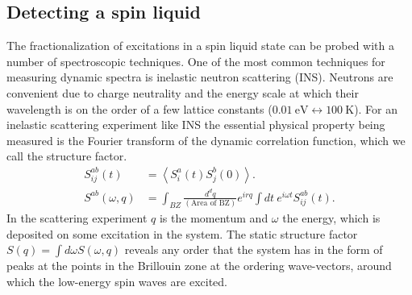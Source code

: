 \documentclass[aps,pra,preprint,groupedaddress]{revtex4-1}
\newcommand{\1}{\mathds{1}}
\begin{document}

\subsection{Detecting a spin liquid}
 
The fractionalization of excitations in a spin liquid state can be probed with a number of spectroscopic techniques. One of the most common techniques for measuring dynamic spectra is inelastic neutron scattering (INS). Neutrons are convenient due to charge neutrality and the energy scale at which their wavelength is on the order of a few lattice constants ($0.01~\textrm{eV} \leftrightarrow 100~\textrm{K}$). For an inelastic scattering experiment like INS the essential physical property being measured is the Fourier transform of the dynamic correlation function, which we call the structure factor. 
\begin{align}
S_{ij}^{ab}(t) &= \left< S_i^a(t) S_j^b(0) \right>.\\
S^{ab}(\omega,q)& = \int_{BZ} \frac{d^dq}{(\textrm{Area of BZ})} e^{i r q} \int {dt}~ e^{i\omega t} S_{ij}^{ab}(t).
\end{align}
In the scattering experiment $q$ is the momentum and $\omega$ the energy, which is deposited on some excitation in the system. The static structure factor $S(q) = \int d\omega S(\omega,q)$ reveals any order that the system has in the form of peaks at the points in the Brillouin zone at the ordering wave-vectors, around which the low-energy spin waves are excited. 
\end{document}
